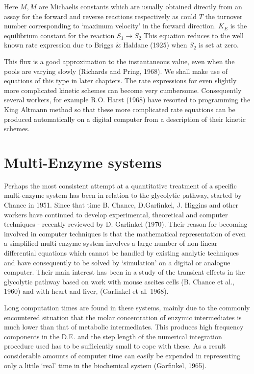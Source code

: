 Here $M, M$ are Michaelis constants which are usually obtained directly from an assay for the forward and reverse reactions respectively as could $T$ the turnover number corresponding to `maximum velocity' in the forward direction. $K_{E}$ is the equilibrium constant for the reaction $S_{1} \rightarrow S_{2}$ This equation reduces to the well known rate expression due to Briggs \& Haldane (1925) when $S_{2}$ is set at zero.

This flux is a good approximation to the instantaneous value, even when the pools are varying slowly (Richards and Pring, 1968). We shall make use of equations of this type in later chapters. The rate expressions for even slightly more complicated kinetic schemes can become very cumbersome. Consequently several workers, for example R.O. Harst (1968) have resorted to programming the King Altmann method so that these more complicated rate equations can be produced automatically on a digital computer from a description of their kinetic schemes.

\section{Multi-Enzyme systems}

Perhaps the most consistent attempt at a quantitative treatment of a specific multi-enzyme system has been in relation to the glycolytic pathway, started by Chance in 1951. Since that time B. Chance, D.Garfinkel, J. Higgins and other workers have continued to develop experimental, theoretical and computer techniques - recently reviewed by D. Garfinkel (1970). Their reason for becoming involved in computer techniques is that the mathematical representation of even a simplified multi-enzyme system involves a large number of non-linear differential equations which cannot be handled by existing analytic techniques and have consequently to be solved by `simulation' on a digital or analogue computer. Their main interest has been in a study of the transient effects in the glycolytic pathway based on work with mouse ascites cells (B. Chance et al., 1960) and with heart and liver, (Garfinkel et al. 1968).

Long computation times are found in these systems, mainly due to the commonly encountered situation that the molar concentration of enzymic intermediates is much lower than that of metabolic intermediates. This produces high frequency components in the D.E. and the step length of the numerical integration procedure used has to be sufficiently small to cope with these. As a result considerable amounts of computer time can easily be expended in representing only a little `real' time in the biochemical system (Garfinkel, 1965).

